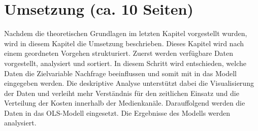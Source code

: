\newpage
\section{Umsetzung (ca. 10 Seiten)}
\label{Umsetzung}
Nachdem die theoretischen Grundlagen im letzten Kapitel vorgestellt wurden, wird in diesem Kapitel die Umsetzung beschrieben. Dieses Kapitel wird nach einem geordneten Vorgehen strukturiert. Zuerst werden verfügbare Daten vorgestellt, analysiert und sortiert. In diesem Schritt wird entschieden, welche Daten die Zielvariable Nachfrage beeinflussen und somit mit in das Modell eingegeben werden. Die deskriptive Analyse unterstützt dabei die Visualisierung der Daten und verleiht mehr Verständnis für den zeitlichen Einsatz und die Verteilung der Kosten innerhalb der Medienkanäle. Darauffolgend werden die Daten in das \ac{OLS}-Modell eingesetzt. Die Ergebnisse des Modells werden analysiert.

